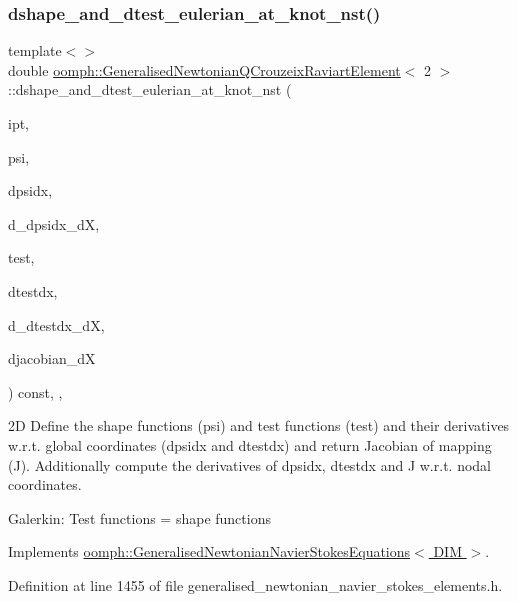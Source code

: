 \subsubsection{\texorpdfstring{dshape\+\_\+and\+\_\+dtest\+\_\+eulerian\+\_\+at\+\_\+knot\+\_\+nst()}{dshape\_and\_dtest\_eulerian\_at\_knot\_nst()}\hspace{0.1cm}{\footnotesize\ttfamily [3/4]}}
{\footnotesize\ttfamily template$<$$>$ \\
double \hyperlink{classoomph_1_1GeneralisedNewtonianQCrouzeixRaviartElement}{oomph\+::\+Generalised\+Newtonian\+Q\+Crouzeix\+Raviart\+Element}$<$ 2 $>$\+::dshape\+\_\+and\+\_\+dtest\+\_\+eulerian\+\_\+at\+\_\+knot\+\_\+nst (\begin{DoxyParamCaption}\item[{const unsigned \&}]{ipt,  }\item[{\hyperlink{classoomph_1_1Shape}{Shape} \&}]{psi,  }\item[{\hyperlink{classoomph_1_1DShape}{D\+Shape} \&}]{dpsidx,  }\item[{\hyperlink{classoomph_1_1RankFourTensor}{Rank\+Four\+Tensor}$<$ double $>$ \&}]{d\+\_\+dpsidx\+\_\+dX,  }\item[{\hyperlink{classoomph_1_1Shape}{Shape} \&}]{test,  }\item[{\hyperlink{classoomph_1_1DShape}{D\+Shape} \&}]{dtestdx,  }\item[{\hyperlink{classoomph_1_1RankFourTensor}{Rank\+Four\+Tensor}$<$ double $>$ \&}]{d\+\_\+dtestdx\+\_\+dX,  }\item[{\hyperlink{classoomph_1_1DenseMatrix}{Dense\+Matrix}$<$ double $>$ \&}]{djacobian\+\_\+dX }\end{DoxyParamCaption}) const\hspace{0.3cm}{\ttfamily [inline]}, {\ttfamily [protected]}, {\ttfamily [virtual]}}

2D Define the shape functions (psi) and test functions (test) and their derivatives w.\+r.\+t. global coordinates (dpsidx and dtestdx) and return Jacobian of mapping (J). Additionally compute the derivatives of dpsidx, dtestdx and J w.\+r.\+t. nodal coordinates.

Galerkin\+: Test functions = shape functions 

Implements \hyperlink{classoomph_1_1GeneralisedNewtonianNavierStokesEquations_a24a93b73dba66e04eabb9b37a9360daa}{oomph\+::\+Generalised\+Newtonian\+Navier\+Stokes\+Equations$<$ D\+I\+M $>$}.



Definition at line 1455 of file generalised\+\_\+newtonian\+\_\+navier\+\_\+stokes\+\_\+elements.\+h.



